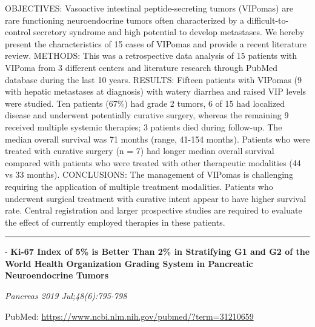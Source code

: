 \documentclass[]{article}
\begin{document}
OBJECTIVES: Vasoactive intestinal peptide-secreting tumors (VIPomas) are
rare functioning neuroendocrine tumors often characterized by a
difficult-to-control secretory syndrome and high potential to develop
metastases. We hereby present the characteristics of 15 cases of VIPomas
and provide a recent literature review. METHODS: This was a
retrospective data analysis of 15 patients with VIPoma from 3 different
centers and literature research through PubMed database during the last
10 years. RESULTS: Fifteen patients with VIPomas (9 with hepatic
metastases at diagnosis) with watery diarrhea and raised VIP levels were
studied. Ten patients (67\%) had grade 2 tumors, 6 of 15 had localized
disease and underwent potentially curative surgery, whereas the
remaining 9 received multiple systemic therapies; 3 patients died during
follow-up. The median overall survival was 71 months (range, 41-154
months). Patients who were treated with curative surgery (n = 7) had
longer median overall survival compared with patients who were treated
with other therapeutic modalities (44 vs 33 months). CONCLUSIONS: The
management of VIPomas is challenging requiring the application of
multiple treatment modalities. Patients who underwent surgical treatment
with curative intent appear to have higher survival rate. Central
registration and larger prospective studies are required to evaluate the
effect of currently employed therapies in these patients.

{}

{}

\begin{center}\rule{0.5\linewidth}{\linethickness}\end{center}

 - \textbf{Ki-67 Index of 5\% is Better Than 2\% in Stratifying G1 and
G2 of the World Health Organization Grading System in Pancreatic
Neuroendocrine Tumors}

\emph{Pancreas 2019 Jul;48(6):795-798}

PubMed: \url{https://www.ncbi.nlm.nih.gov/pubmed/?term=31210659}
\end{document}
